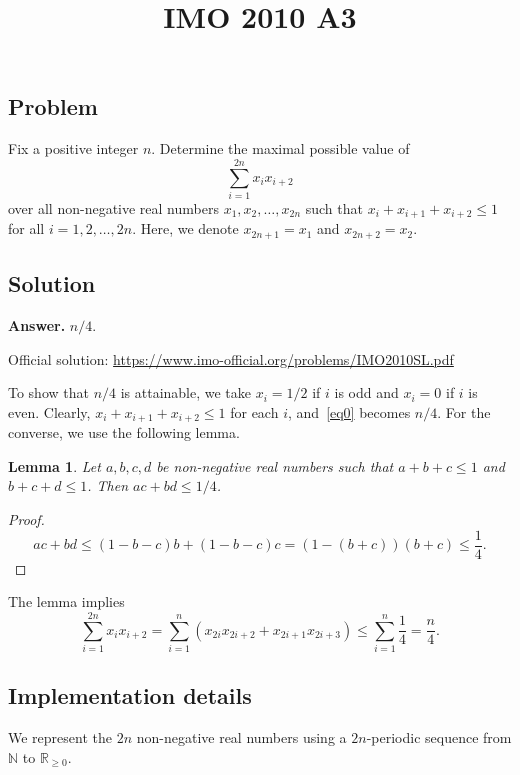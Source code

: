 \documentclass{article}
\title{IMO 2010 A3}
\author{}
\date{}
\newcommand{\N}{\mathbb{N}}
\newcommand{\R}{\mathbb{R}}
\newtheorem{lemma}{Lemma}
\begin{document}
\maketitle



\subsection*{Problem}

Fix a positive integer $n$.
Determine the maximal possible value of
\[ \sum_{i = 1}^{2n} x_i x_{i + 2} \tag{*}\label{eq0} \]
    over all non-negative real numbers $x_1, x_2, \ldots, x_{2n}$ such that $x_i + x_{i + 1} + x_{i + 2} \leq 1$ for all $i = 1, 2, \ldots, 2n$.
Here, we denote $x_{2n + 1} = x_1$ and $x_{2n + 2} = x_2$.



\subsection*{Solution}

\textbf{Answer.} $n/4$.

Official solution: \url{https://www.imo-official.org/problems/IMO2010SL.pdf}

To show that $n/4$ is attainable, we take $x_i = 1/2$ if $i$ is odd and $x_i = 0$ if $i$ is even.
Clearly, $x_i + x_{i + 1} + x_{i + 2} \leq 1$ for each $i$, and~\eqref{eq0} becomes $n/4$.
For the converse, we use the following lemma.

\begin{lemma}\label{lem1}
Let $a, b, c, d$ be non-negative real numbers such that $a + b + c \leq 1$ and $b + c + d \leq 1$.
Then $ac + bd \leq 1/4$.
\end{lemma}
\begin{proof}
\[ ac + bd \leq (1 - b - c)b + (1 - b - c)c = (1 - (b + c))(b + c) \leq \frac{1}{4}. \]
\end{proof}

The lemma implies
\[ \sum_{i = 1}^{2n} x_i x_{i + 2} = \sum_{i = 1}^n (x_{2i} x_{2i + 2} + x_{2i + 1} x_{2i + 3}) \leq \sum_{i = 1}^n \frac{1}{4} = \frac{n}{4}. \]



\subsection*{Implementation details}

We represent the $2n$ non-negative real numbers using a $2n$-periodic sequence from $\N$ to $\R_{\geq 0}$.
\end{document}
